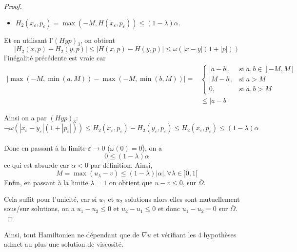 \begin{proof}
\begin{itemize}
    \item $H_2(x_\varepsilon,p_\varepsilon)=\max(-M, H(x_\varepsilon,p_\varepsilon))\le (1-\lambda)\alpha$.
\end{itemize}
Et en utilisant l'$(Hyp)_3$, on obtient
\begin{equation*}
    |H_2(x,p)-H_2(y,p)|\le |H(x,p)-H(y,p)| \le \omega(|x-y|(1+|p|))
\end{equation*}
l'inégalité précédente est vraie car
\begin{equation*}
    \begin{split}
        |\max(-M,\min(a,M))-\max(-M,\min(b,M))|=&
        \begin{cases}
            |a-b|, &\text{si } a,b\in [-M,M]\\
            |M-b|, &\text{si } a>M\\
            0, &\text{si }a,b>M
        \end{cases}\\
        &\leq |a-b|
    \end{split}
\end{equation*}

Ainsi on a par $(Hyp)_3$: 
\begin{equation*}
    -\omega (|x_\varepsilon-y_\varepsilon|(1+|p_\varepsilon|))\le H_2(x_\varepsilon,p_\varepsilon)-H_2(y_\varepsilon,p_\varepsilon)\le H_2(x_\varepsilon,p_\varepsilon)\le (1-\lambda)\alpha
\end{equation*}\\

Donc en passant à la limite $\varepsilon\longrightarrow 0$ ($\omega(0)=0$), on a 
\begin{equation*}
    0\le (1-\lambda)\alpha
\end{equation*} 
ce qui est absurde car $\alpha<0$ par définition.
Ainsi,
\begin{equation*}
    M=\max(u_\lambda-v)\le(1-\lambda)|\alpha|, \forall \lambda\in]0,1[
\end{equation*}
Enfin, en passant à la limite $\lambda=1$ on obtient que $u-v\le 0$, sur $\overline{\Omega}$. 

Cela suffit pour l'unicité, car si $u_1$ et $u_2$ solutions alors elles sont mutuellement sous/sur solutions, on a $u_1-u_2\le 0$ et $u_2-u_1\le 0$ et donc $u_1-u_2=0$ sur $\overline{\Omega}$.\\
\end{proof}
Ainsi, tout Hamiltonien ne dépendant que de $\nabla u$ et vérifiant les 4 hypothèses admet au plus une solution de viscosité.

